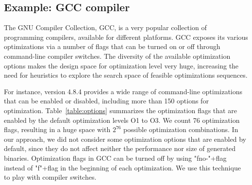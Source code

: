 \subsection{Example: GCC compiler}

The GNU Compiler Collection, GCC, is a very popular collection of programming compilers, available for different platforms.
GCC exposes its various optimizations via a number of flags that can be turned on or off through command-line compiler switches. 
The diversity of the available optimization options makes the design space for optimization level very huge, increasing the need for heuristics to explore the search space of feasible optimizations sequences.


For instance, version 4.8.4  provides a wide range of command-line optimizations that can be enabled or disabled, including more than 150 options for optimization. 
Table~\ref{table:options} summarizes the optimization flags that are enabled by the default optimization levels O1 to O3.
We count 76 optimization flags, resulting in a huge space with $2^{76}$ possible optimization combinations.
In our approach, we did not consider some optimization options that are enabled by default, since they do not affect neither the performance nor size of generated binaries.
Optimization flags in GCC can be turned off by using "fno-"+flag instead of "f"+flag in the beginning of each optimization. 
We use this technique to play with compiler switches.

